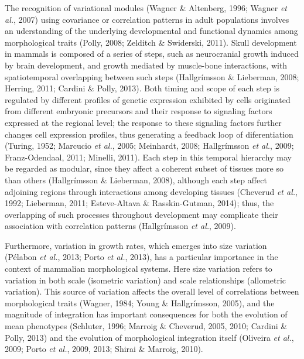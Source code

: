 \documentclass[12pt,twoside]{report}
\begin{document}
The recognition of variational modules (Wagner \& Altenberg, 1996;
Wagner \emph{et al.}, 2007) using covariance or correlation patterns in
adult populations involves an uderstanding of the underlying
developmental and functional dynamics among morphological traits (Polly,
2008; Zelditch \& Swiderski, 2011). Skull development in mammals is
composed of a series of steps, such as neurocranial growth induced by
brain development, and growth mediated by muscle-bone interactions, with
spatiotemporal overlapping between such steps (Hallgrímsson \&
Lieberman, 2008; Herring, 2011; Cardini \& Polly, 2013). Both timing and
scope of each step is regulated by different profiles of genetic
expression exhibited by cells originated from different embryonic
precursors and their response to signaling factors expressed at the
regional level; the response to these signaling factors further changes
cell expression profiles, thus generating a feedback loop of
diferentiation (Turing, 1952; Marcucio \emph{et al.}, 2005; Meinhardt,
2008; Hallgrímsson \emph{et al.}, 2009; Franz-Odendaal, 2011; Minelli,
2011). Each step in this temporal hierarchy may be regarded as modular,
since they affect a coherent subset of tissues more so than others
(Hallgrímsson \& Lieberman, 2008), although each step affect adjoining
regions through interactions among developing tissues (Cheverud \emph{et
al.}, 1992; Lieberman, 2011; Esteve-Altava \& Rasskin-Gutman, 2014);
thus, the overlapping of such processes throughout development may
complicate their association with correlation patterns (Hallgrímsson
\emph{et al.}, 2009).

Furthermore, variation in growth rates, which emerges into size
variation (Pélabon \emph{et al.}, 2013; Porto \emph{et al.}, 2013), has
a particular importance in the context of mammalian morphological
systems. Here size variation refers to variation in both scale
(isometric variation) and scale relationships (allometric variation).
This source of variation affects the overall level of correlations
between morphological traits (Wagner, 1984; Young \& Hallgrímsson,
2005), and the magnitude of integration has important consequences for
both the evolution of mean phenotypes (Schluter, 1996; Marroig \&
Cheverud, 2005, 2010; Cardini \& Polly, 2013) and the evolution of
morphological integration itself (Oliveira \emph{et al.}, 2009; Porto
\emph{et al.}, 2009, 2013; Shirai \& Marroig, 2010).
\end{document}
